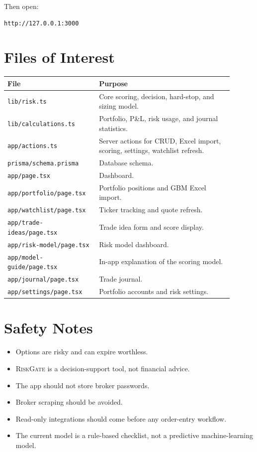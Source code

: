 \documentclass[11pt]{article}
\newcommand{\RiskGate}{\textsc{RiskGate}}
\begin{document}
Then open:

\begin{lstlisting}
http://127.0.0.1:3000
\end{lstlisting}

\section{Files of Interest}

\begin{longtable}{p{0.35\linewidth} p{0.55\linewidth}}
\toprule
\textbf{File} & \textbf{Purpose} \\
\midrule
\texttt{lib/risk.ts} & Core scoring, decision, hard-stop, and sizing model. \\
\texttt{lib/calculations.ts} & Portfolio, P\&L, risk usage, and journal statistics. \\
\texttt{app/actions.ts} & Server actions for CRUD, Excel import, scoring, settings, watchlist refresh. \\
\texttt{prisma/schema.prisma} & Database schema. \\
\texttt{app/page.tsx} & Dashboard. \\
\texttt{app/portfolio/page.tsx} & Portfolio positions and GBM Excel import. \\
\texttt{app/watchlist/page.tsx} & Ticker tracking and quote refresh. \\
\texttt{app/trade-ideas/page.tsx} & Trade idea form and score display. \\
\texttt{app/risk-model/page.tsx} & Risk model dashboard. \\
\texttt{app/model-guide/page.tsx} & In-app explanation of the scoring model. \\
\texttt{app/journal/page.tsx} & Trade journal. \\
\texttt{app/settings/page.tsx} & Portfolio accounts and risk settings. \\
\bottomrule
\end{longtable}

\section{Safety Notes}

\begin{itemize}[noitemsep]
  \item Options are risky and can expire worthless.
  \item \RiskGate{} is a decision-support tool, not financial advice.
  \item The app should not store broker passwords.
  \item Broker scraping should be avoided.
  \item Read-only integrations should come before any order-entry workflow.
  \item The current model is a rule-based checklist, not a predictive machine-learning model.
\end{itemize}
\end{document}
